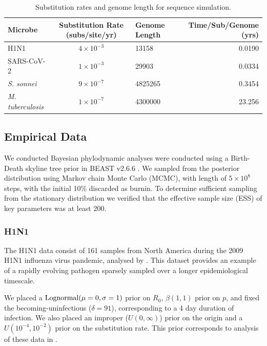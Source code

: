 \documentclass{article}
\begin{document}
\begin{spacing}{1.5}
\begin{table}[h!]
    \centering
    \caption{Substitution rates and genome length for sequence simulation.}
    \begin{tabular}{l|c|l|r}
    \hline
    Microbe                     &   Substitution Rate (subs/site/yr) & Genome Length & Time/Sub/Genome (yrs)  \\
    \hline
    H1N1                        & $4\times10^{-3}$ & 13158 & 0.0190\\
    SARS-CoV-2                  & $1\times10^{-3}$ & 29903 & 0.0334\\
    \textit{S. sonnei}    & $9\times10^{-7}$ & 4825265  & 0.3454\\
    \textit{M. tuberculosis}    &   $1\times10^{-7}$ & 4300000 & 23.256\\
    \hline
    \end{tabular}
    \label{tab:seq_parms}
\end{table}

\subsection*{Empirical Data}
We conducted Bayesian phylodynamic analyses were conducted using a Birth-Death skyline tree prior in BEAST v2.6.6 \citep{bouckaert_beast_2019}. We sampled from the posterior distribution using Markov chain Monte Carlo (MCMC), with length of $5\times10^{8}$ steps, with the initial 10\% discarded as burnin. To determine sufficient sampling from the stationary distribution we verified that the effective sample size (ESS) of key parameters was at least 200.

\subsubsection*{H1N1}
The H1N1 data consist of 161 samples from North America during the 2009 H1N1 influenza virus pandemic, analysed by \citet{hedge_2013_real-time}. This  dataset provides an example of a rapidly evolving pathogen sparsely sampled over a longer epidemiological timescale. 

We placed a $\textnormal{Lognormal}(\mu=0,\sigma=1)$ prior on $R_0$, $\beta(1,1)$ prior on $p$, and fixed the becoming-uninfectious ($\delta = 91$), corresponding to a 4 day duration of infection. We also placed an improper ($U(0,\infty)$) prior on the origin and a $U(10^{-4},10^{-2})$ prior on the substitution rate. This prior corresponds to analysis of these data in \citet{featherstone_decoding_2023}.


\end{spacing}
\end{document}
